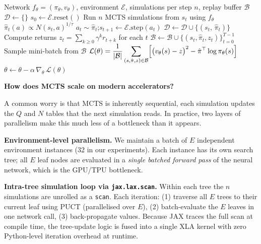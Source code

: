 \documentclass{article}
\begin{document}
\begin{algorithm}[h]
\caption{Single-agent AlphaZero via Expert Iteration}
\label{alg:expert_iter}
\begin{algorithmic}[1]
\Require Network $f_\theta = (\pi_\theta, v_\theta)$, environment $\mathcal{E}$,
         simulations per step $n$, replay buffer $\mathcal{B}$
\Repeat
  \State $\mathcal{D} \leftarrow \{\}$ 
  \State $s_0 \leftarrow \mathcal{E}.\text{reset}()$
                       
    \State Run $n$ MCTS simulations from $s_t$ using $f_\theta$
    \State $\hat{\pi}_t(a) \propto N(s_t, a)^{1/\tau}$ 
    \State $a_t \sim \hat{\pi}_t$;\quad $s_{t+1} \leftarrow \mathcal{E}.\text{step}(a_t)$
    \State $\mathcal{D} \leftarrow \mathcal{D} \cup \{(s_t,\, \hat{\pi}_t)\}$
  \EndFor
  \State Compute returns $z_t = \sum_{k \geq 0} \gamma^k r_{t+k}$ for each $t$ 
  \State $\mathcal{B} \leftarrow \mathcal{B} \cup \{(s_t, \hat{\pi}_t, z_t)\}_{t=0}^{T-1}$
  \State Sample mini-batch from $\mathcal{B}$                     
  \State $\mathcal{L}(\theta) =
    \displaystyle\frac{1}{|\mathcal{B}|}\sum_{(s,\hat{\pi},z)\in\mathcal{B}}
    \Bigl[\bigl(v_\theta(s) - z\bigr)^2
          - \hat{\pi}^\top \log \pi_\theta(s)\Bigr]$
  \State $\theta \leftarrow \theta - \alpha\,\nabla_\theta\,\mathcal{L}(\theta)$
\end{algorithmic}
\end{algorithm}

\textbf{How does MCTS scale on modern accelerators?}

A common worry is that MCTS is inherently sequential, each
simulation updates the $Q$ and $N$ tables that the next simulation
reads. In practice, two layers of parallelism make this much less of a
bottleneck than it appears.

\textbf{Environment-level parallelism.}
We maintain a batch of $E$ independent environment instances (32 in our
experiments). Each instance has its own search tree; all $E$ leaf nodes
are evaluated in a \emph{single batched forward pass} of the neural
network, which is the GPU/TPU bottleneck.

\textbf{Intra-tree simulation loop via \texttt{jax.lax.scan}.}
Within each tree the $n$ simulations are unrolled as a \texttt{scan}.
Each iteration: (1) traverse all $E$ trees to their current leaf using
PUCT (parallelised over $E$), (2) batch-evaluate the $E$ leaves in one
network call, (3) back-propagate values. Because JAX traces the full
scan at compile time, the tree-update logic is fused into a single XLA
kernel with zero Python-level iteration overhead at runtime.
\end{document}
